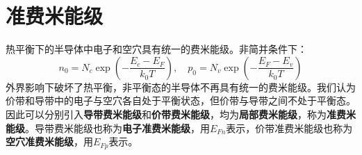 \section{准费米能级}

热平衡下的半导体中电子和空穴具有统一的费米能级。非简并条件下：
\begin{equation}
    n_0=N_c\exp{\left(-\frac{E_c-E_F}{k_0T}\right)},\quad p_0=N_v\exp{\left(-\frac{E_F-E_v}{k_0T}\right)}\label{eq:chap-5-equilibrium-distribute}
\end{equation}
外界影响下破坏了热平衡，非平衡态的半导体不再具有统一的费米能级。我们认为价带和导带中的电子与空穴各自处于平衡状态，但价带与导带之间不处于平衡态。因此可以分别引入\textbf{导带费米能级}和\textbf{价带费米能级}，均为\textbf{局部费米能级}，称为\textbf{准费米能级}。导带费米能级也称为\textbf{电子准费米能级}，用$E_{Fn}$表示，价带准费米能级也称为\textbf{空穴准费米能级}，用$E_{Fp}$表示。

